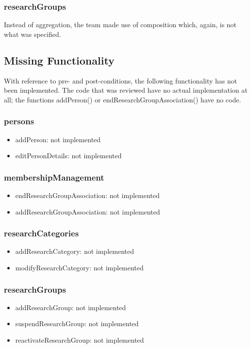 \documentclass{article}
\begin{document}
\subsubsection{researchGroups}

Instead of aggregation, the team made use of composition which, again, is not what was specified.
\newpage

\subsection{Missing Functionality}

With reference to pre- and post-conditions, the following functionality has not been implemented. The code that was reviewed have no actual implementation at all; the functions addPerson() or endResearchGroupAssociation() have no code.

\subsubsection{persons} 
\begin{itemize}
	\item addPerson: not implemented
	\item editPersonDetails: not implemented
\end{itemize}

\subsubsection{membershipManagement}
\begin{itemize}
	\item endResearchGroupAssociation: not implemented
	\item addResearchGroupAssociation: not implemented
\end{itemize}

\subsubsection{researchCategories}
\begin{itemize}
	\item addResearchCategory: not implemented
	\item modifyResearchCategory: not implemented
\end{itemize}

\subsubsection{researchGroups}
\begin{itemize}
	\item addResearchGroup: not implemented
	\item suspendResearchGroup: not implemented
	\item reactivateResearchGroup: not implemented
\end{itemize}
\end{document}
